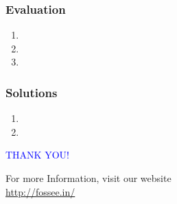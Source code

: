 \documentclass[14pt,compress]{beamer}
\begin{document}
\begin{frame}[fragile]
\frametitle{Evaluation}
\begin{enumerate}
\item 
\item 
\item 
\end{enumerate}
\end{frame}
\begin{frame}

\frametitle{Solutions}
\begin{enumerate}
\item 
\vspace{15pt}
\item 
\end{enumerate}
\end{frame}
\begin{frame}

\begin{block}{}
  \begin{center}
  \textcolor{blue}{\Large THANK YOU!} 
  \end{center}
  \end{block}
\begin{block}{}
  \begin{center}
    For more Information, visit our website\\
    \url{http://fossee.in/}
  \end{center}  
  \end{block}
\end{frame}
\end{document}
